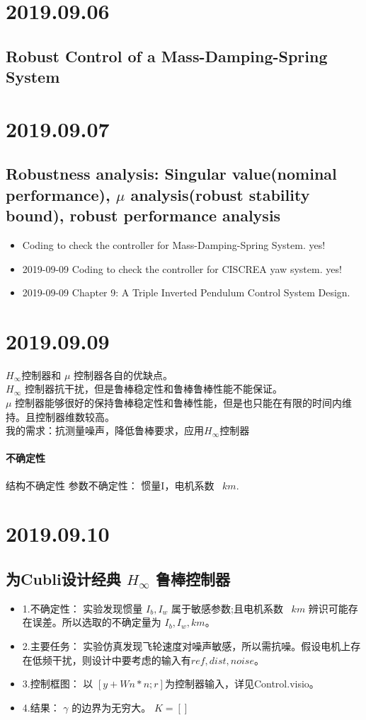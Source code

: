 \documentclass[UTF8,a4paper]{ctexart}
\begin{document}
\section{2019.09.06}
\subsection{Robust Control of a Mass-Damping-Spring System}
\section{2019.09.07}
\subsection{Robustness analysis: Singular value(nominal performance), $\mu$ analysis(robust stability bound), robust performance analysis}
\begin{itemize}
\item Coding to check the controller for Mass-Damping-Spring System. yes!
\item 2019-09-09 Coding to check the controller for CISCREA yaw system. yes!
\item 2019-09-09 Chapter 9: A Triple Inverted Pendulum Control System Design. 
\end{itemize}
\section{2019.09.09}
$H_{\infty}$控制器和 $\mu$ 控制器各自的优缺点。\\
$H_{\infty}$ 控制器抗干扰，但是鲁棒稳定性和鲁棒鲁棒性能不能保证。\\
$\mu$ 控制器能够很好的保持鲁棒稳定性和鲁棒性能，但是也只能在有限的时间内维持。且控制器维数较高。\\
我的需求：抗测量噪声，降低鲁棒要求，应用$H_{\infty}$控制器\\
\paragraph{不确定性}
结构不确定性
参数不确定性： 惯量I，电机系数 ~$ km $.
\section{2019.09.10}
\subsection{为Cubli设计经典 $H_{\infty}$ 鲁棒控制器}
\begin{itemize}
\item 1.不确定性： 实验发现惯量 $I_b, I_w$ 属于敏感参数;且电机系数 ~$km$ 辨识可能存在误差。所以选取的不确定量为 ${I_b, I_w,km}$。
\item 2.主要任务： 实验仿真发现飞轮速度对噪声敏感，所以需抗噪。假设电机上存在低频干扰，则设计中要考虑的输入有${ref,dist,noise}$。
\item 3.控制框图： 以 $[y+Wn*n;r]$为控制器输入，详见Control.visio。
\item 4.结果： $\gamma$ 的边界为无穷大。 $K = []$
\end{itemize}
\end{document}
